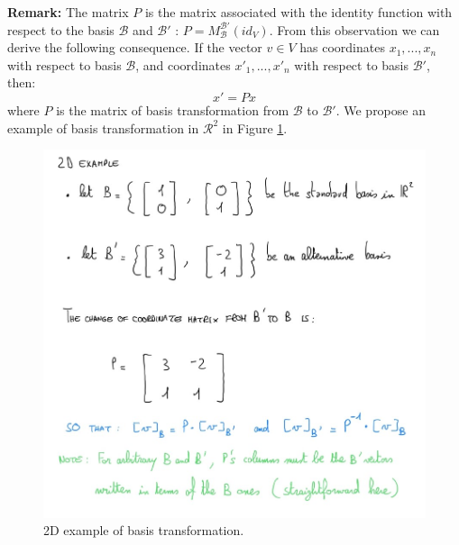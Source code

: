 
\textbf{Remark:} The matrix $P$ is the matrix associated with the identity
function with respect to the basis $\mathcal{B}$ and $\mathcal{B}'$ :
$P = M^{\mathcal{B}'}_{\mathcal{B}}(id_{V})$. From this observation we can derive
the following consequence. If the vector $v \in V$ has coordinates
$x_{1},...,x_{n}$ with respect to basis $\mathcal{B}$, and coordinates $x'_{1},..
.,x'_{n}$ with respect to basis $\mathcal{B}'$, then:
\begin{equation}
	x' = Px
\end{equation}
where $P$ is the matrix of basis transformation from $\mathcal{B}$ to $\mathcal{B}
'$. We propose an example of basis transformation in $\mathcal{R}^{2}$ in Figure
\ref{fig:basis_transformation}.

\begin{figure}[H]
	\centering
	\includegraphics[scale=0.65]{images/04_LinearAlgebra_basisTransformation.jpg}
	\caption{2D example of basis transformation.}
	\label{fig:basis_transformation}
\end{figure}

